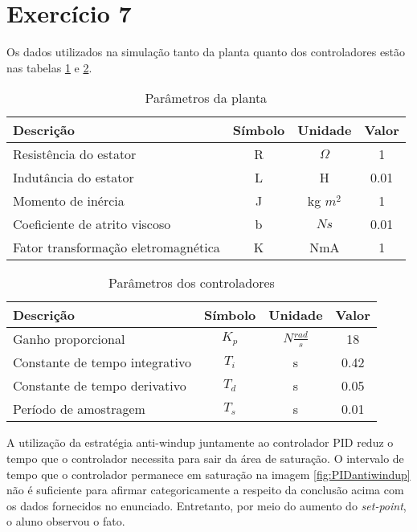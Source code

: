 \section*{Exercício 7}
\label{ex:7}
\raggedbottom

Os dados utilizados na simulação tanto da planta quanto dos controladores estão nas tabelas \ref{tab:ex7planta} e \ref{tab:ex7controlador}. 

\begin{table}[H]
    \centering
    \begin{tabular}{|l|c|c|c|}
    \hline
    Descrição & Símbolo & Unidade & Valor \\ \hline
    Resistência do estator & R & $\Omega$ & 1 \\
    Indutância do estator & L & H & 0.01 \\
    Momento de inércia & J & kg $m^2$  & 1 \\
    Coeficiente de atrito viscoso & b & $Ns$ & 0.01 \\
    Fator transformação eletromagnética & K & NmA & 1 \\\hline
    \end{tabular}
    \caption{Parâmetros da planta}
    \label{tab:ex7planta}
\end{table}

\begin{table}[H]
    \centering
    \begin{tabular}{|l|c|c|c|}
    \hline
    Descrição & Símbolo & Unidade & Valor \\ \hline
    Ganho proporcional & $K_p$ & $N \frac{rad}{s}$ & 18 \\
    Constante de tempo integrativo & $T_i$ & s & 0.42 \\
    Constante de tempo derivativo & $T_d$ & s  & 0.05 \\
    Período de amostragem & $T_s$ & s & 0.01 \\\hline
    \end{tabular}
    \caption{Parâmetros dos controladores}
    \label{tab:ex7controlador}
\end{table}

A utilização da estratégia anti-windup juntamente ao controlador PID reduz o tempo que o controlador necessita para sair da área de saturação. O intervalo de tempo que o controlador permanece em saturação na imagem \ref{fig:PIDantiwindup} não é suficiente para afirmar categoricamente a respeito da conclusão acima com os dados fornecidos no enunciado. Entretanto, por meio do aumento do \emph{set-point}, o aluno observou o fato.

